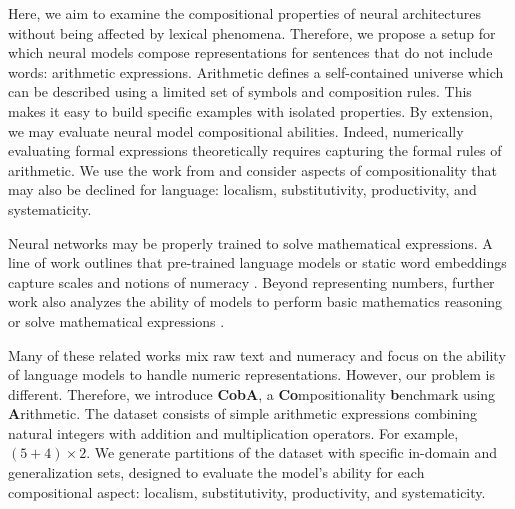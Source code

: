 Here, we aim to examine the compositional properties of neural architectures without being affected by lexical phenomena. Therefore, we propose a setup for which neural models compose representations for sentences that do not include words: arithmetic expressions. Arithmetic defines a self-contained universe which can be described using a limited set of symbols and composition rules. This makes it easy to build specific examples with isolated properties. By extension, we may evaluate neural model compositional abilities. Indeed, numerically evaluating formal expressions theoretically requires capturing the formal rules of arithmetic. We use the work from \textcite{hupkes_20} and consider aspects of compositionality that may also be declined for language: localism, substitutivity, productivity, and systematicity.

Neural networks may be properly trained to solve mathematical expressions. A line of work outlines that pre-trained language models or static word embeddings capture scales and notions of numeracy \parencite{wallace_19, naik_19, sundararaman_20, zhang_20, thawani_21}. Beyond representing numbers, further work also analyzes the ability of models to perform basic mathematics reasoning \parencite{saxton_19, dua_19, geva_20} or solve mathematical expressions \parencite{lample_20}.

Many of these related works mix raw text and numeracy and focus on the ability of language models to handle numeric representations. However, our problem is different. Therefore, we introduce \textbf{CobA}, a \textbf{Co}mpositionality \textbf{b}enchmark using \textbf{A}rithmetic. The dataset consists of simple arithmetic expressions combining natural integers with addition and multiplication operators. For example, $(5 + 4) \times 2$. We generate partitions of the dataset with specific in-domain and generalization sets, designed to evaluate the model's ability for each compositional aspect: localism, substitutivity, productivity, and systematicity. 



